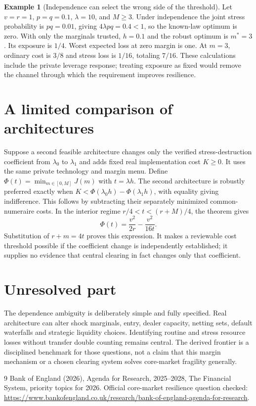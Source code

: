 \documentclass[11pt]{article}
\theoremstyle{definition}
\newtheorem{example}{Example}
\begin{document}
\begin{example}[Independence can select the wrong side of the threshold]
Let $v=r=1$, $p=q=0.1$, $\lambda=10$, and $M\geq3$. Under independence the joint stress probability is $pq=0.01$, giving $4\lambda pq=0.4<1$, so the known-law optimum is zero. With only the marginals trusted, $h=0.1$ and the robust optimum is $m^*=3$. Its exposure is $1/4$. Worst expected loss at zero margin is one. At $m=3$, ordinary cost is $3/8$ and stress loss is $1/16$, totaling $7/16$. These calculations include the private leverage response; treating exposure as fixed would remove the channel through which the requirement improves resilience.
\end{example}

\section*{A limited comparison of architectures}
Suppose a second feasible architecture changes only the verified stress-destruction coefficient from $\lambda_0$ to $\lambda_1$ and adds fixed real implementation cost $K\geq0$. It uses the same private technology and margin menu. Define $\Phi(t)=\min_{m\in[0,M]}J(m)$ with $t=\lambda h$. The second architecture is robustly preferred exactly when $K<\Phi(\lambda_0h)-\Phi(\lambda_1h)$, with equality giving indifference. This follows by subtracting their separately minimized common-numeraire costs. In the interior regime $r/4<t<(r+M)/4$, the theorem gives
\[
 \Phi(t)=\frac{v^2}{2r}-\frac{v^2}{16t}.
\]
Substitution of $r+m=4t$ proves this expression. It makes a reviewable cost threshold possible if the coefficient change is independently established; it supplies no evidence that central clearing in fact changes only that coefficient.

\section*{Unresolved part}
The dependence ambiguity is deliberately simple and fully specified. Real architecture can alter shock marginals, entry, dealer capacity, netting sets, default waterfalls and strategic liquidity choices. Identifying routine and stress resource losses without transfer double counting remains central. The derived frontier is a disciplined benchmark for those questions, not a claim that this margin mechanism or a chosen clearing system solves core-market fragility generally.
\begin{thebibliography}{9}
 Bank of England (2026), Agenda for Research, 2025--2028, The Financial System, priority topics for 2026. Official core-market resilience question checked: \url{https://www.bankofengland.co.uk/research/bank-of-england-agenda-for-research}.
\end{thebibliography}
\end{document}
